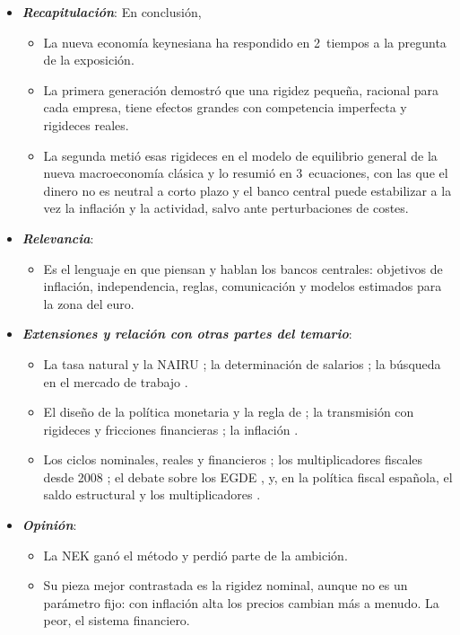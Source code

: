 \documentclass[11pt]{article}
\begin{document}
\begin{itemize}
\item \textbf{\emph{Recapitulación}}: En conclusión,
  \begin{itemize}
  \item La nueva economía keynesiana ha respondido en 2~tiempos a la pregunta de la exposición.
  \item La primera generación demostró que una rigidez pequeña, racional para cada empresa, tiene efectos grandes con competencia imperfecta y rigideces reales.
  \item La segunda metió esas rigideces en el modelo de equilibrio general de la nueva macroeconomía clásica y lo resumió en 3~ecuaciones, con las que el dinero no es neutral a corto plazo y el banco central puede estabilizar a la vez la inflación y la actividad, salvo ante perturbaciones de costes.
  \end{itemize}
\item \textbf{\emph{Relevancia}}:
  \begin{itemize}
  \item Es el lenguaje en que piensan y hablan los bancos centrales: objetivos de inflación, independencia, reglas, comunicación y modelos estimados para la zona del euro.
  \end{itemize}
\item \textbf{\emph{Extensiones y relación con otras partes del temario}}:
  \begin{itemize}
  \item La tasa natural y la NAIRU ; la determinación de salarios ; la búsqueda en el mercado de trabajo .
  \item El diseño de la política monetaria y la regla de  ; la transmisión con rigideces y fricciones financieras ; la inflación .
  \item Los ciclos nominales, reales y financieros ; los multiplicadores fiscales desde 2008 ; el debate sobre los EGDE , y, en la política fiscal española, el saldo estructural y los multiplicadores .
  \end{itemize}
\item \textbf{\emph{Opinión}}:
  \begin{itemize}
  \item La NEK ganó el método y perdió parte de la ambición.
  \item Su pieza mejor contrastada es la rigidez nominal, aunque no es un parámetro fijo: con inflación alta los precios cambian más a menudo. La peor, el sistema financiero.

\end{itemize}
\end{itemize}
\end{document}
